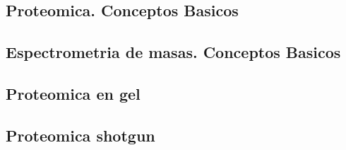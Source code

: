 %


\chapter*{}





\section{Proteomica. Conceptos Basicos}



\section{Espectrometria de masas. Conceptos Basicos}



\section{Proteomica en gel}



\section{Proteomica shotgun}




